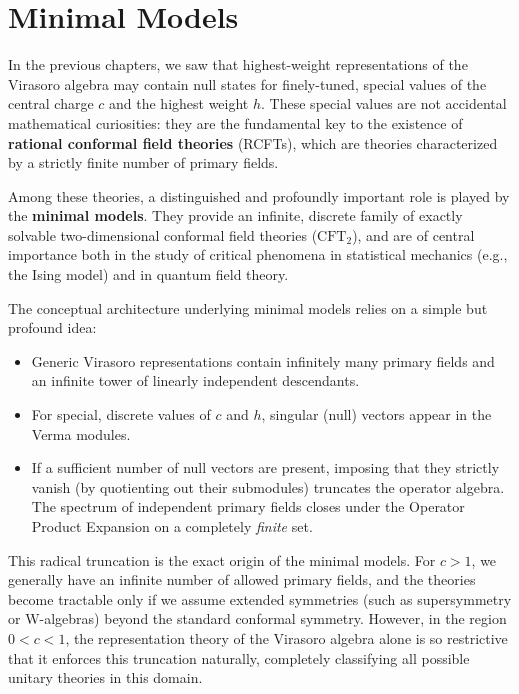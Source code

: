 \chapter{Minimal Models}

In the previous chapters, we saw that highest-weight representations of the Virasoro algebra may contain null states for finely-tuned, special values of the central charge \(c\) and the highest weight \(h\). These special values are not accidental mathematical curiosities: they are the fundamental key to the existence of \textbf{rational conformal field theories} (RCFTs), which are theories characterized by a strictly finite number of primary fields.

Among these theories, a distinguished and profoundly important role is played by the \textbf{minimal models}. They provide an infinite, discrete family of exactly solvable two-dimensional conformal field theories (\(\text{CFT}_2\)), and are of central importance both in the study of critical phenomena in statistical mechanics (e.g., the Ising model) and in quantum field theory.

The conceptual architecture underlying minimal models relies on a simple but profound idea:
\begin{itemize}
    \item Generic Virasoro representations contain infinitely many primary fields and an infinite tower of linearly independent descendants.
    \item For special, discrete values of \(c\) and \(h\), singular (null) vectors appear in the Verma modules.
    \item If a sufficient number of null vectors are present, imposing that they strictly vanish (by quotienting out their submodules) truncates the operator algebra. The spectrum of independent primary fields closes under the Operator Product Expansion on a completely \textit{finite} set.
\end{itemize}

This radical truncation is the exact origin of the minimal models. For \(c > 1\), we generally have an infinite number of allowed primary fields, and the theories become tractable only if we assume extended symmetries (such as supersymmetry or W-algebras) beyond the standard conformal symmetry. However, in the region \(0 < c < 1\), the representation theory of the Virasoro algebra alone is so restrictive that it enforces this truncation naturally, completely classifying all possible unitary theories in this domain.

